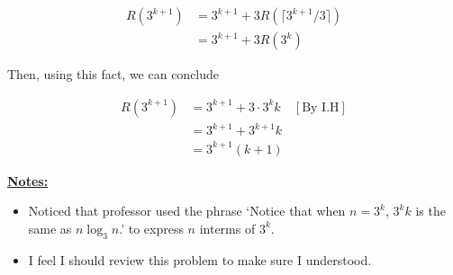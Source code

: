 \documentclass[12pt]{article}
\begin{document}
\begin{enumerate}[a.]
\begin{mdframed}
        \begin{align}
            R(3^{k+1}) &= 3^{k+1} + 3R(\lceil 3^{k+1}/3 \rceil)\\
            &= 3^{k+1} + 3R(3^k)
        \end{align}

        \bigskip

        Then, using this fact, we can conclude

        \begin{align}
            R(3^{k+1}) &= 3^{k+1} + 3 \cdot 3^kk & [\text{By I.H}]\\
            &= 3^{k+1} + 3^{k+1}k\\
            &= 3^{k+1}(k + 1)
        \end{align}
    \end{mdframed}

    \bigskip

    \underline{\textbf{Notes:}}

    \bigskip

    \begin{itemize}
        \item Noticed that professor used the phrase `Notice that when $n = 3^k$,
        $3^kk$ is the same as $n\log_3 n$.' to express $n$ interms of $3^k$.
        \item I feel I should review this problem to make sure I understood.
    \end{itemize}











\end{enumerate}
\end{document}
